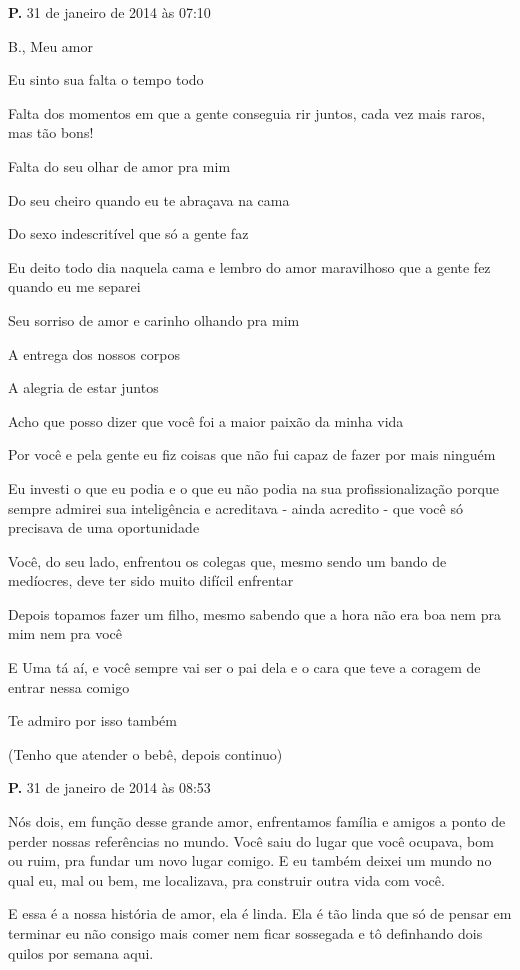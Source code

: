 \textbf{P.} 31 de janeiro de 2014 às 07:10

B., Meu amor

Eu sinto sua falta o tempo todo

Falta dos momentos em que a gente conseguia rir juntos, cada vez mais
raros, mas tão bons!

Falta do seu olhar de amor pra mim

Do seu cheiro quando eu te abraçava na cama

Do sexo indescritível que só a gente faz

Eu deito todo dia naquela cama e lembro do amor maravilhoso que a gente
fez quando eu me separei

Seu sorriso de amor e carinho olhando pra mim

A entrega dos nossos corpos

A alegria de estar juntos

Acho que posso dizer que você foi a maior paixão da minha vida

Por você e pela gente eu fiz coisas que não fui capaz de fazer por mais
ninguém

Eu investi o que eu podia e o que eu não podia na sua profissionalização
porque sempre admirei sua inteligência e acreditava - ainda acredito -
que você só precisava de uma oportunidade

Você, do seu lado, enfrentou os colegas que, mesmo sendo um bando de
medíocres, deve ter sido muito difícil enfrentar

Depois topamos fazer um filho, mesmo sabendo que a hora não era boa nem
pra mim nem pra você

E Uma tá aí, e você sempre vai ser o pai dela e o cara que teve a
coragem de entrar nessa comigo

Te admiro por isso também

(Tenho que atender o bebê, depois continuo)

\textbf{P.} 31 de janeiro de 2014 às 08:53

Nós dois, em função desse grande amor, enfrentamos família e amigos a
ponto de perder nossas referências no mundo. Você saiu do lugar que você
ocupava, bom ou ruim, pra fundar um novo lugar comigo. E eu também
deixei um mundo no qual eu, mal ou bem, me localizava, pra construir
outra vida com você.

E essa é a nossa história de amor, ela é linda. Ela é tão linda que só
de pensar em terminar eu não consigo mais comer nem ficar sossegada e tô
definhando dois quilos por semana aqui.

